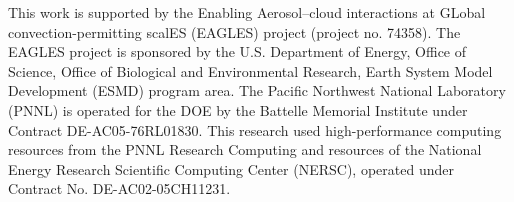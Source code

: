 \documentclass[journal abbreviation, manuscript]{copernicus}
\begin{document}
\noappendix       %












\begin{acknowledgements}
This work is supported by the Enabling Aerosol–cloud interactions at GLobal convection-permitting scalES (EAGLES) project (project no. 74358). The EAGLES project is sponsored by the U.S. Department of Energy, Office of Science, Office of Biological and Environmental Research, Earth System Model Development (ESMD) program area. The Pacific Northwest National Laboratory (PNNL) is operated for the DOE by the Battelle Memorial Institute under Contract DE-AC05-76RL01830. This research used high-performance computing resources from the PNNL Research Computing and resources of the National Energy Research Scientific Computing Center (NERSC), operated under Contract No. DE-AC02-05CH11231.
\end{acknowledgements}
\end{document}
